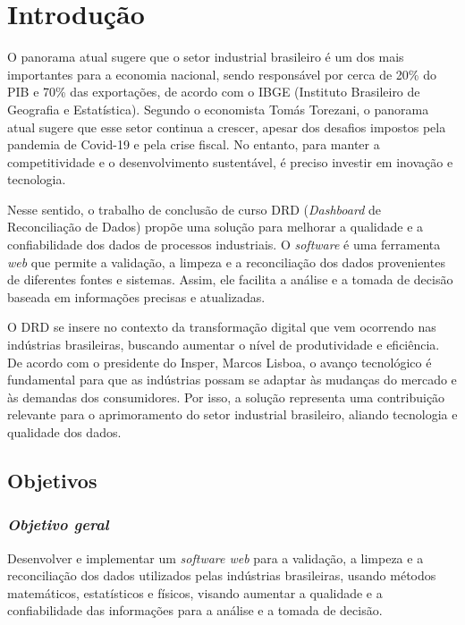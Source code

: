 \chapter{Introdução} \label{Introducao}

O panorama atual sugere que o setor industrial brasileiro é um dos mais importantes para a economia nacional, sendo responsável por cerca de 20\% do PIB e 70\% das exportações, de acordo com o IBGE (Instituto Brasileiro de Geografia e Estatística). Segundo o economista Tomás Torezani, o panorama atual sugere que esse setor continua a crescer, apesar dos desafios impostos pela pandemia de Covid-19 e pela crise fiscal. No entanto, para manter a competitividade e o desenvolvimento sustentável, é preciso investir em inovação e tecnologia.

Nesse sentido, o trabalho de conclusão de curso DRD (\textit{Dashboard} de Reconciliação de Dados) propõe uma solução para melhorar a qualidade e a confiabilidade dos dados de processos industriais. O \textit{software} é uma ferramenta \textit{web} que permite a validação, a limpeza e a reconciliação dos dados provenientes de diferentes fontes e sistemas. Assim, ele facilita a análise e a tomada de decisão baseada em informações precisas e atualizadas.

O DRD se insere no contexto da transformação digital que vem ocorrendo nas indústrias brasileiras, buscando aumentar o nível de produtividade e eficiência. De acordo com o presidente do Insper, Marcos Lisboa, o avanço tecnológico é fundamental para que as indústrias possam se adaptar às mudanças do mercado e às demandas dos consumidores. Por isso, a solução representa uma contribuição relevante para o aprimoramento do setor industrial brasileiro, aliando tecnologia e qualidade dos dados.

\section{Objetivos}

\subsection{\textit{Objetivo geral}}

Desenvolver e implementar um \textit{software web} para a validação, a limpeza e a reconciliação dos dados utilizados pelas indústrias brasileiras, usando métodos matemáticos, estatísticos e físicos, visando aumentar a qualidade e a confiabilidade das informações para a análise e a tomada de decisão.

